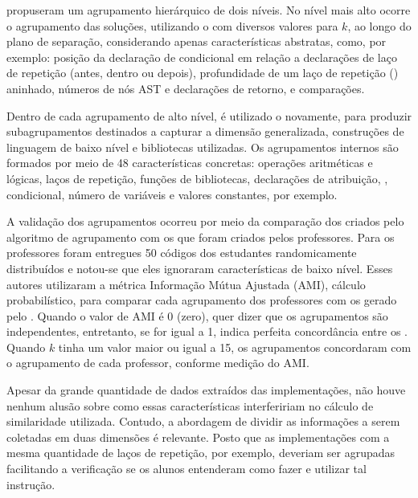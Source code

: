 		 propuseram um agrupamento hierárquico de dois
		níveis. No nível mais alto ocorre o agrupamento das soluções, utilizando o
		 com diversos valores para $k$, ao longo do plano de separação,
		considerando apenas características abstratas, como, por exemplo: posição da
		declaração de condicional em relação a declarações de laço de repetição (antes,
		dentro ou depois), profundidade de um laço de repetição ()
		aninhado, números de nós \acs{AST} e declarações de retorno,  e
		comparações.
		
		Dentro de cada agrupamento de alto nível, é utilizado o 
		novamente, para produzir subagrupamentos destinados a capturar a dimensão
		generalizada, construções de linguagem de baixo nível e bibliotecas utilizadas.
		Os agrupamentos internos são formados por meio de 48 características concretas:
		operações aritméticas e lógicas, laços de repetição, funções de bibliotecas,
		declarações de atribuição, , condicional, número de variáveis
		e valores constantes, por exemplo.
		
		A validação dos agrupamentos ocorreu por meio da comparação dos 
		criados pelo algoritmo de agrupamento com os que foram criados pelos professores.
		Para os professores foram entregues 50 códigos dos estudantes randomicamente
		distribuídos e notou-se que eles ignoraram características de baixo nível.
		Esses autores utilizaram a métrica Informação Mútua Ajustada (\ac{AMI}), cálculo
		probabilístico, para comparar cada agrupamento dos professores com os
		 gerado pelo  \cite{macqueen1967}. Quando o
		valor de \acs{AMI} é 0 (zero), quer dizer que os agrupamentos são independentes,
		entretanto, se for igual a 1, indica perfeita concordância entre os
		. Quando $k$ tinha um valor maior ou igual a 15, os
		agrupamentos concordaram com o agrupamento de cada professor, conforme medição
		do \acs{AMI}.
		
		Apesar da grande quantidade de dados extraídos das implementações, não houve
		nenhum alusão sobre como essas características interfeririam no cálculo de
		similaridade utilizada. Contudo, a abordagem de dividir as informações a serem
		coletadas em duas dimensões é relevante. Posto que as implementações com
		a mesma quantidade de laços de repetição, por exemplo, deveriam ser agrupadas
		facilitando a verificação se os alunos entenderam como fazer e utilizar
		tal instrução.
		

